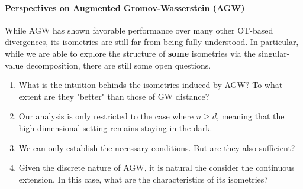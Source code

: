 \paragraph{Perspectives on Augmented Gromov-Wasserstein (AGW)}
While AGW has shown favorable performance over many other OT-based divergences,
its isometries are still far from being fully understood. In particular, while
we are able to explore the structure of \textbf{some} isometries via the singular-value
decomposition, there are still some open questions.
\begin{enumerate}
    \item What is the intuition behinds the isometries induced by AGW?
    To what extent are they "better" than those of GW distance?
    \item Our analysis is only restricted to the case where $n \geq d$, meaning that
    the high-dimensional setting remains staying in the dark.
    \item We can only establish the necessary conditions. But are they also sufficient?
    \item Given the discrete nature of AGW, it is natural the consider the continuous extension.
    In this case, what are the characteristics of its isometries?
\end{enumerate}

\vfill
